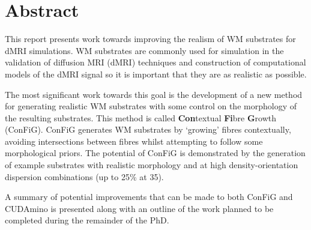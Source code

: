\chapter*{Abstract}

This report presents work towards improving the realism of \ac{WM} substrates for \ac{dMRI} simulations.
\ac{WM} substrates are commonly used for simulation in the validation of diffusion MRI (dMRI) techniques and construction of computational models of the \ac{dMRI} signal so it is important that they are as realistic as possible.

The most significant work towards this goal is the development of a new method for generating realistic \ac{WM} substrates with some control on the morphology of the resulting substrates.
This method is called \textbf{Con}textual \textbf{Fi}bre \textbf{G}rowth (\acs{ConFiG}).
\ac{ConFiG} generates \ac{WM} substrates by `growing' fibres contextually, avoiding intersections between fibres whilst attempting to follow some morphological priors.
The potential of \ac{ConFiG} is demonstrated by the generation of example substrates with realistic morphology and at high density-orientation dispersion combinations (up to 25\% at 35\degree).


A summary of potential improvements that can be made to both \ac{ConFiG} and CUDAmino is presented along with an outline of the work planned to be completed during the remainder of the PhD. 
\acresetall
